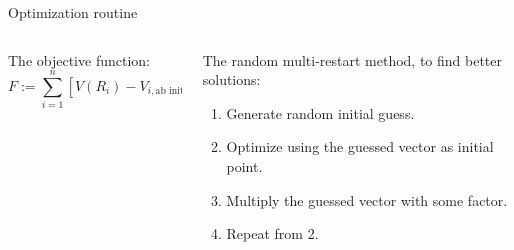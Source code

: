 \documentclass{beamer}
\begin{document}
\begin{frame}{Optimization routine}
    \begin{columns}[c]
        \begin{column}{0.45\textwidth}
            \item The objective function:
            \begin{equation}
                F := \sum^n_{i=1}\left[V(R_i) - V_{i,\text{ab initio}}\right]^2.
                \label{eq:sumsquaredresidual}
            \end{equation}
        \end{column}
        \vrule{}
        \begin{column}{0.55\textwidth}
            \item The random multi-restart method, to find better solutions: \begin{enumerate}
                \item Generate random initial guess.
                \item Optimize using the guessed vector as initial point.
                \item Multiply the guessed vector with some factor.
                \item Repeat from 2.
            \end{enumerate}
        \end{column}
    \end{columns}
\end{frame}

%
\end{document}
